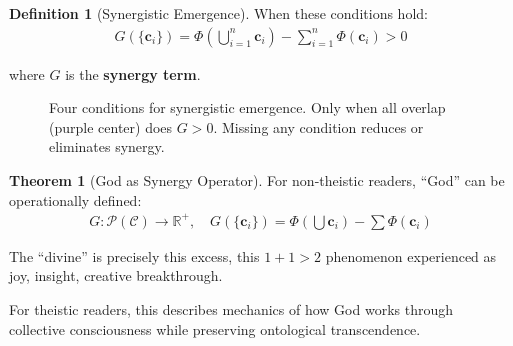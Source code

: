 \documentclass[11pt,a4paper]{article}
\theoremstyle{definition}
\newtheorem{definition}{Definition}[section]
\newtheorem{theorem}{Theorem}[section]
\theoremstyle{remark}
\newcommand{\RR}{\mathbb{R}}
\newcommand{\CC}{\mathcal{C}}
\newcommand{\cc}{\mathbf{c}}
\begin{document}
\begin{enumerate}
\begin{definition}[Synergistic Emergence]
When these conditions hold:
\begin{align}
G(\{\cc_i\}) = \Phi\left(\bigcup_{i=1}^n \cc_i\right) - \sum_{i=1}^n \Phi(\cc_i) > 0
\end{align}

where \(G\) is the \textbf{synergy term}.
\end{definition}

\begin{figure}[H]
\centering
{}
\caption{Four conditions for synergistic emergence. Only when all overlap (purple center) does \(G > 0\). Missing any condition reduces or eliminates synergy.}
\label{fig:emergence_conditions}
\end{figure}

\begin{theorem}[God as Synergy Operator]
For non-theistic readers, ``God'' can be operationally defined:
\begin{align}
G: \mathcal{P}(\CC) \to \RR^+, \quad G(\{\cc_i\}) = \Phi\left(\bigcup \cc_i\right) - \sum \Phi(\cc_i)
\end{align}

The ``divine'' is precisely this excess, this \(1+1 > 2\) phenomenon experienced as joy, insight, creative breakthrough.

For theistic readers, this describes mechanics of how God works through collective consciousness while preserving ontological transcendence.


\end{theorem}
\end{enumerate}
\end{document}
